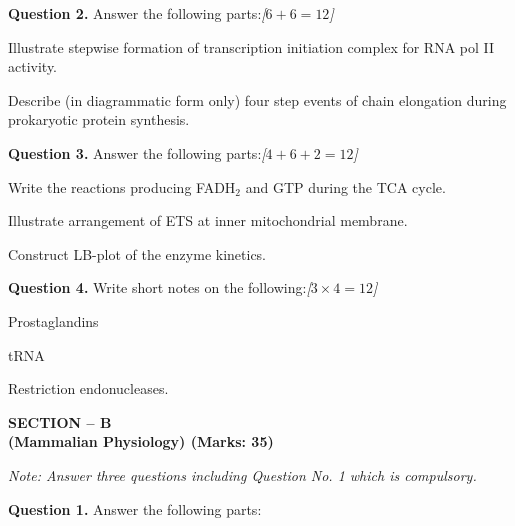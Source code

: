 \documentclass[11pt,a4paper]{article}
\newcommand{\pts}[1]{\hfill   \textit{[#1]}}
\begin{document}
\medskip


\noindent   \textbf{Question 2.} Answer the following parts:\pts{$6 + 6 = 12$}

\begin{parts}
  \item Illustrate stepwise formation of transcription initiation complex for RNA pol II activity.
  \item Describe (in diagrammatic form only) four step events of chain elongation during prokaryotic protein synthesis.
\end{parts}

\medskip


\noindent   \textbf{Question 3.} Answer the following parts:\pts{$4 + 6 + 2 = 12$}

\begin{parts}
  \item Write the reactions producing FADH$_2$ and GTP during the TCA cycle.
  \item Illustrate arrangement of ETS at inner mitochondrial membrane.
  \item Construct LB-plot of the enzyme kinetics.
\end{parts}

\medskip


\noindent   \textbf{Question 4.} Write short notes on the following:\pts{$3  \times 4 = 12$}

\begin{parts}
  \item Prostaglandins
  \item tRNA
  \item Restriction endonucleases.
\end{parts}

\pagebreak

\begin{center}
   \textbf{SECTION -- B} \\
   \textbf{(Mammalian Physiology) (Marks: 35)}
\end{center}

\smallskip



\noindent   \textit{Note: Answer three questions including Question No. 1 which is compulsory.}

\medskip


\noindent   \textbf{Question 1.} Answer the following parts:
\end{document}
